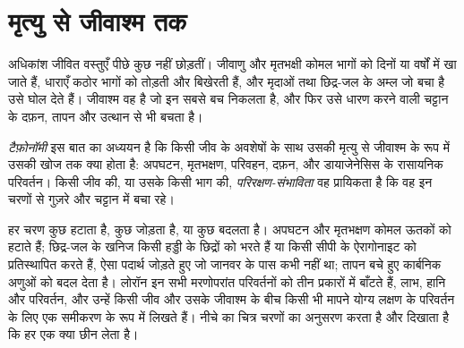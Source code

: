 \section{मृत्यु से जीवाश्म तक}\label{sec:b2:palaeoenvironments:taphonomy}

अधिकांश जीवित वस्तुएँ पीछे कुछ नहीं छोड़तीं। जीवाणु और मृतभक्षी कोमल भागों को दिनों या वर्षों में
खा जाते हैं, धाराएँ कठोर भागों को तोड़ती और बिखेरती हैं, और मृदाओं तथा छिद्र-जल के अम्ल
जो बचा है उसे घोल देते हैं। जीवाश्म वह है जो इन सबसे बच निकलता है, और फिर उसे धारण करने वाली चट्टान के
दफ़न, तापन और उत्थान से भी बचता है।

\begin{definition}[टैफ़ोनॉमी; परिरक्षण-संभाविता]\label{def:b2:palaeoenvironments:taphonomy}
\emph{टैफ़ोनॉमी} इस बात का अध्ययन है कि किसी जीव के अवशेषों के साथ
उसकी मृत्यु से जीवाश्म के रूप में उसकी खोज तक क्या होता है: अपघटन, मृतभक्षण, परिवहन, दफ़न, और
डायाजेनेसिस के रासायनिक परिवर्तन। किसी जीव की, या उसके किसी भाग की, \emph{परिरक्षण-संभाविता}
वह प्रायिकता है कि वह इन चरणों से गुज़रे
और चट्टान में बचा रहे।
\end{definition}

हर चरण कुछ हटाता है, कुछ जोड़ता है, या कुछ बदलता है। अपघटन और मृतभक्षण कोमल
ऊतकों को हटाते हैं; छिद्र-जल के खनिज किसी हड्डी के छिद्रों को भरते हैं या किसी
सीपी के ऐरागोनाइट को प्रतिस्थापित करते हैं, ऐसा पदार्थ जोड़ते हुए जो जानवर के पास कभी नहीं था; तापन बचे हुए कार्बनिक अणुओं को बदल देता है।
लोरॉन इन सभी मरणोपरांत परिवर्तनों को तीन प्रकारों में बाँटते हैं, लाभ, हानि और परिवर्तन, और
उन्हें किसी जीव और उसके जीवाश्म के बीच किसी भी मापने योग्य लक्षण के परिवर्तन के लिए एक समीकरण के रूप में
लिखते हैं। नीचे का चित्र चरणों का अनुसरण करता है और दिखाता है कि हर एक क्या छीन लेता है।

